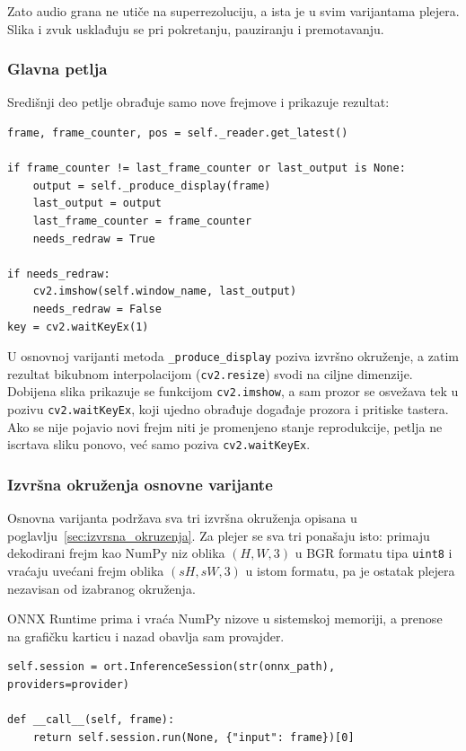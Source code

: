 \documentclass[12pt,a4paper]{article}
\begin{document}
Zato audio grana ne utiče na superrezoluciju, a ista je u svim varijantama plejera. Slika i zvuk usklađuju se pri pokretanju, pauziranju i premotavanju.

\subsubsection{Glavna petlja}

Središnji deo petlje obrađuje samo nove frejmove i prikazuje rezultat:

\begin{verbatim}
frame, frame_counter, pos = self._reader.get_latest()

if frame_counter != last_frame_counter or last_output is None:
    output = self._produce_display(frame)
    last_output = output
    last_frame_counter = frame_counter
    needs_redraw = True
    
if needs_redraw:
    cv2.imshow(self.window_name, last_output)
    needs_redraw = False
key = cv2.waitKeyEx(1)
\end{verbatim}

U osnovnoj varijanti metoda \texttt{\_produce\_display} poziva izvršno okruženje, a zatim rezultat bikubnom interpolacijom (\texttt{cv2.resize}) svodi na ciljne dimenzije. Dobijena slika prikazuje se funkcijom \texttt{cv2.imshow}, a sam prozor se osvežava tek u pozivu \texttt{cv2.waitKeyEx}, koji ujedno obrađuje događaje prozora i pritiske tastera. Ako se nije pojavio novi frejm niti je promenjeno stanje reprodukcije, petlja ne iscrtava sliku ponovo, već samo poziva \texttt{cv2.waitKeyEx}.

\subsubsection{Izvršna okruženja osnovne varijante}

Osnovna varijanta podržava sva tri izvršna okruženja opisana u poglavlju~\ref{sec:izvrsna_okruzenja}. Za plejer se sva tri ponašaju isto: primaju dekodirani frejm kao NumPy niz oblika $(H,W,3)$ u BGR formatu tipa \texttt{uint8} i vraćaju uvećani frejm oblika $(sH,sW,3)$ u istom formatu, pa je ostatak plejera nezavisan od izabranog okruženja.

ONNX Runtime prima i vraća NumPy nizove u sistemskoj memoriji, a prenose na grafičku karticu i nazad obavlja sam provajder.
\begin{verbatim}
self.session = ort.InferenceSession(str(onnx_path), providers=provider)

def __call__(self, frame):
    return self.session.run(None, {"input": frame})[0]
\end{verbatim}
\end{document}
